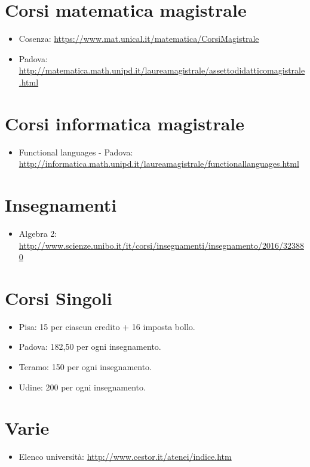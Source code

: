 \documentclass[a4paper,10pt]{article}
\begin{document}
\section{Corsi matematica magistrale}
\begin{itemize}
 \item Cosenza: \url{https://www.mat.unical.it/matematica/CorsiMagistrale}
 \item Padova: \url{http://matematica.math.unipd.it/laureamagistrale/assettodidatticomagistrale.html}
\end{itemize}

\section{Corsi informatica magistrale}
\begin{itemize}
 \item Functional languages - Padova: \url{http://informatica.math.unipd.it/laureamagistrale/functionallanguages.html}
\end{itemize}


\section{Insegnamenti}
\begin{itemize}
 \item Algebra 2: \url{http://www.scienze.unibo.it/it/corsi/insegnamenti/insegnamento/2016/323880}
\end{itemize}

\section{Corsi Singoli}
\begin{itemize}
 \item Pisa: 15 per ciascun credito + 16 imposta bollo.
 \item Padova: 182,50 per ogni insegnamento.
 \item Teramo: 150 per ogni insegnamento.
 \item Udine: 200 per ogni insegnamento. 
\end{itemize}

\section{Varie}
\begin{itemize}
 \item Elenco università: \url{http://www.cestor.it/atenei/indice.htm}
\end{itemize}
\end{document}
